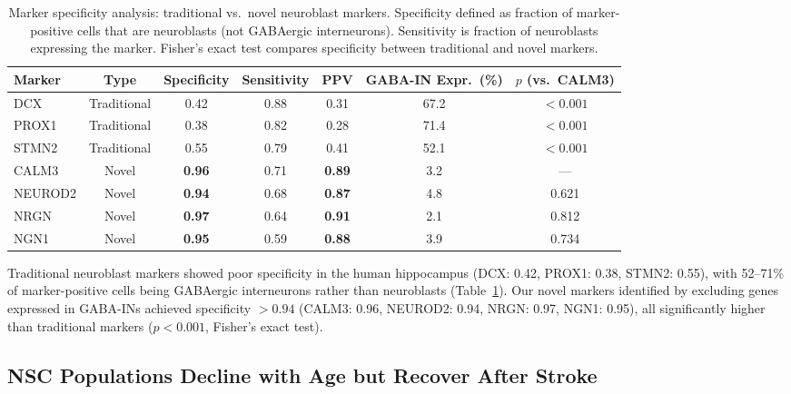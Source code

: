 \documentclass[11pt]{article}
\begin{document}
\begin{table}[H]
\centering
\caption{Marker specificity analysis: traditional vs.\ novel neuroblast markers. Specificity defined as fraction of marker-positive cells that are neuroblasts (not GABAergic interneurons). Sensitivity is fraction of neuroblasts expressing the marker. Fisher's exact test compares specificity between traditional and novel markers.}
\label{tab:markers}
\begin{tabular}{lcccccc}
\toprule
Marker & Type & Specificity & Sensitivity & PPV & GABA-IN Expr.\ (\%) & $p$ (vs.\ CALM3) \\
\midrule
DCX & Traditional & 0.42 & 0.88 & 0.31 & 67.2 & $< 0.001$ \\
PROX1 & Traditional & 0.38 & 0.82 & 0.28 & 71.4 & $< 0.001$ \\
STMN2 & Traditional & 0.55 & 0.79 & 0.41 & 52.1 & $< 0.001$ \\
\midrule
CALM3 & Novel & \textbf{0.96} & 0.71 & \textbf{0.89} & 3.2 & --- \\
NEUROD2 & Novel & \textbf{0.94} & 0.68 & \textbf{0.87} & 4.8 & 0.621 \\
NRGN & Novel & \textbf{0.97} & 0.64 & \textbf{0.91} & 2.1 & 0.812 \\
NGN1 & Novel & \textbf{0.95} & 0.59 & \textbf{0.88} & 3.9 & 0.734 \\
\bottomrule
\end{tabular}
\end{table}

Traditional neuroblast markers showed poor specificity in the human hippocampus (DCX: 0.42, PROX1: 0.38, STMN2: 0.55), with 52--71\% of marker-positive cells being GABAergic interneurons rather than neuroblasts (Table~\ref{tab:markers}). Our novel markers identified by excluding genes expressed in GABA-INs achieved specificity $> 0.94$ (CALM3: 0.96, NEUROD2: 0.94, NRGN: 0.97, NGN1: 0.95), all significantly higher than traditional markers ($p < 0.001$, Fisher's exact test).

\subsection{NSC Populations Decline with Age but Recover After Stroke}
\end{document}
